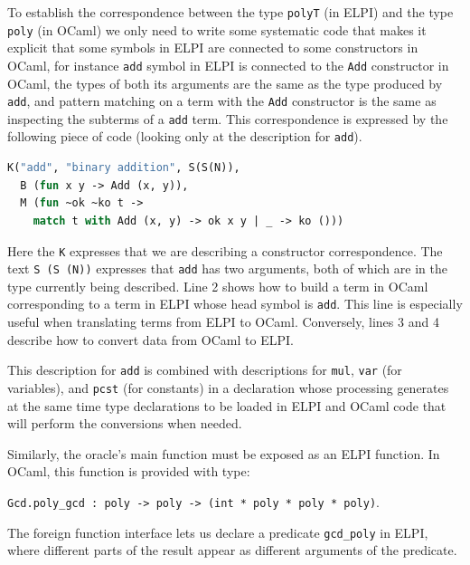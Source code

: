 \documentclass{jflart}
\begin{document}
To establish the correspondence between the type \texttt{polyT} (in ELPI) and the type \texttt{poly} (in OCaml) we only need to write some systematic code
that makes it explicit that some symbols in ELPI are connected to some
constructors in OCaml, for instance \texttt{add} symbol in ELPI is connected to
the \texttt{Add} constructor in OCaml, the types of both its arguments are
the same as the type produced by \texttt{add}, and pattern matching on a term
with the \texttt{Add} constructor is the same as inspecting the subterms of
a \texttt{add} term.  This correspondence is expressed by the following piece of
code (looking only at the description for \texttt{add}).
\label{sec:foreign-declaration}
\begin{lstlisting}[language=ML]
K("add", "binary addition", S(S(N)),
  B (fun x y -> Add (x, y)),
  M (fun ~ok ~ko t ->
    match t with Add (x, y) -> ok x y | _ -> ko ()))
\end{lstlisting}
Here the \texttt{K} expresses that we are describing a constructor correspondence.
The text \texttt{S (S (N))} expresses that \texttt{add} has two arguments, both of which are in the type currently being described.  Line 2 shows how to build a term
in OCaml corresponding to a term in ELPI whose head symbol is \texttt{add}.  This
line is especially useful when translating terms from ELPI to OCaml.
Conversely, lines 3 and 4 describe how to convert data from OCaml to ELPI.

This description for \texttt{add} is combined with descriptions for \texttt{mul},
\texttt{var} (for variables), and \texttt{pcst} (for constants) in a declaration
whose processing generates at the same time type declarations to be loaded
in ELPI and OCaml code that will perform the conversions when needed.

Similarly, the oracle's main function must be exposed as an
ELPI function.  In OCaml, this function is provided with type:
\begin{center}
  \texttt{Gcd.poly\_gcd : poly -> poly -> (int * poly * poly * poly)}.
\end{center}
The foreign function interface lets us declare a predicate \texttt{gcd\_poly} in
ELPI, where different parts of the result appear as different arguments of
the predicate.
\end{document}
